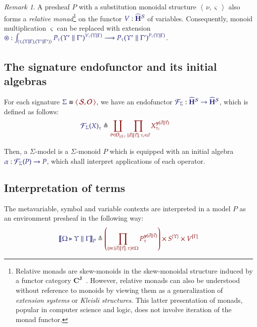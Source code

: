 \documentclass[11pt]{article}
\theoremstyle{definition}
\theoremstyle{remark}
\newtheorem{remark}[thm]{Remark}
\numberwithin{equation}{section}
\def\IModeColorName{MidnightBlue}
\def\OModeColorName{Maroon}
\newcommand\IMode[1]{{\color{\IModeColorName}{#1}}}
\newcommand\OMode[1]{{\color{\OModeColorName}{#1}}}
\newcommand\Of[2]{\IMode{#1}: \IMode{#2}}
\newcommand\MkValence[3]{%
  \ifthenelse{\equal{#1}{}}{}{%
    \{#1\}%
  }%
  \ifthenelse{\equal{#2}{}}{}{%
    [#2]%
  }.\, #3%
}
\newcommand\MkArity[2]{(#1)\, #2}
\newcommand\Match[2]{\IMode{#1}\equiv\OMode{#2}}
\newcommand\Sorts{\mathcal{S}}
\newcommand\Operators{\mathcal{O}}
\newcommand\HypCat{\mathbf{H}}
\newcommand\Pair[2]{\left\langle\,#1,#2\,\right\rangle}
\newcommand\Tuple[1]{\left\langle#1 \right\rangle}
\newcommand\Define[2]{\IMode{#1}\triangleq\OMode{#2}}
\newcommand\SigFun[1]{\mathcal{F}_{#1}}
\newcommand\SemBrackets[1]{\left\llbracket#1\right\rrbracket}
\newcommand\Yoneda[1]{\boldsymbol{y} (#1)}
\begin{document}
\begin{remark}
  A presheaf $P$ with a substitution monoidal structure $\Pair{\nu}{\varsigma}$
  also forms a \emph{relative monad}\footnote{Relative monads are skew-monoids
    in the skew-monoidal structure induced by a functor category
    $\mathbf{C}^\mathbf{J}$~\cite{altenkirch-chapman-uustalu:2015}. However,
    relative monads can also be understood without reference to monoids by
    viewing them as a generalization of \emph{extension systems} or
    \emph{Kleisli structures}. This latter presentation of monads, popular in
    computer science and logic, does not involve iteration of the monad
    functor.} on the functor $\Of{V}{\widehat{\HypCat}^\Sorts}$ of variables.
  Consequently, monoid multiplication $\varsigma$ can be replaced with extension
$\Of{\circledast}{\int_{\Tuple{\tau, (\Upsilon\parallel\Gamma), (\Upsilon'\parallel\Gamma')}}{{{P}_{\tau}(\Upsilon'\parallel\Gamma')}^{{V}_{\tau}(\Upsilon\parallel\Gamma)} \longrightarrow {{P}_{\tau}(\Upsilon'\parallel\Gamma')}^{{P}_{\tau}(\Upsilon\parallel\Gamma)}}}$.
\end{remark}

\subsection{The signature endofunctor and its initial algebras}

For each signature $\Match{\Sigma}{\Pair{\Sorts}{\Operators}}$, we have an
endofunctor
$\Of{\SigFun{\Sigma}}{\widehat{\HypCat}^\Sorts\to\widehat{\HypCat}^\Sorts}$,
which is defined as follows:
\begin{align*}
  \IMode{{\SigFun{\Sigma}(X)}_{\tau}}
    &\triangleq
    \OMode{
      \coprod_{\vartheta\in \Operators_{\MkArity{\vec{v}}{\tau}}}
      \prod_{\MkValence{\vec{\sigma}}{\vec{\tau}}{\tau_i}\in\vec{v}}
      X_{\tau_i}^{\Yoneda{\vec{\sigma}\parallel\vec{\tau}}}
    }
\end{align*}

Then, a $\Sigma$-model is a $\Sigma$-monoid $P$ which is equipped with an initial
algebra $\Of{\alpha}{\SigFun{\Sigma}(P)\to P}$, which shall interpret
applications of each operator.

\subsection{Interpretation of terms}

The metavariable, symbol and variable contexts are interpreted in a model $P$ as an
environment presheaf in the following way:
\[
  \Define{
    \SemBrackets{
      \Omega\triangleright\Upsilon\parallel\Gamma
    }_P
  }{
    \left(\prod_{(m:\MkValence{\vec{\sigma}}{\vec{\tau}}{\tau})\in\Omega}P_{\tau}^{\Yoneda{\vec{\sigma}\parallel\vec{\tau}}}\right)
    \times
    S^{\{\Upsilon\}}
    \times
    V^{[\Gamma]}
  }
\]
\end{document}

